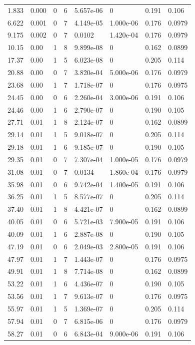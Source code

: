 \documentclass[preview]{standalone}
\begin{document}
{{\begin{tabular}{L{1.2cm}C{1.2cm} C{0.3cm}C{0.5cm} C{1.4cm}C{1.4cm} C{1.4cm}C{1.4cm}}
  1.833  &  0.000  & 0     &  6 &  5.657e-06  & 0  & 0.191 &  0.106   \\ 
  6.622  &  0.001  & 0     &  7 &  4.149e-05  & 1.000e-06  & 0.176 &  0.0979   \\ 
  9.175  &  0.002  & 0     &  7 &  0.0102  & 1.420e-04  & 0.176 &  0.0979   \\ 
  10.15  &  0.00  & 1     &  8 &  9.899e-08  & 0  & 0.162 &  0.0899   \\ 
  17.37  &  0.00  & 1     &  5 &  6.023e-08  & 0  & 0.205 &  0.114   \\ 
  20.88  &  0.00  & 0     &  7 &  3.820e-04  & 5.000e-06  & 0.176 &  0.0979   \\ 
  23.68  &  0.00  & 1     &  7 &  1.718e-07  & 0  & 0.176 &  0.0975   \\ 
  24.45  &  0.00  & 0     &  6 &  2.260e-04  & 3.000e-06  & 0.191 &  0.106   \\ 
  24.46  &  0.00  & 1     &  6 &  2.790e-07  & 0  & 0.190 &  0.105   \\ 
  27.71  &  0.01  & 1     &  8 &  2.124e-07  & 0  & 0.162 &  0.0899   \\ 
  29.14  &  0.01  & 1     &  5 &  9.018e-07  & 0  & 0.205 &  0.114   \\ 
  29.18  &  0.01  & 1     &  6 &  9.185e-07  & 0  & 0.190 &  0.105   \\ 
  29.35  &  0.01  & 0     &  7 &  7.307e-04  & 1.000e-05  & 0.176 &  0.0979   \\ 
  31.08  &  0.01  & 0     &  7 &  0.0134  & 1.860e-04  & 0.176 &  0.0979   \\ 
  35.98  &  0.01  & 0     &  6 &  9.742e-04  & 1.400e-05  & 0.191 &  0.106   \\ 
  36.25  &  0.01  & 1     &  5 &  8.577e-07  & 0  & 0.205 &  0.114   \\ 
  37.40  &  0.01  & 1     &  8 &  4.421e-07  & 0  & 0.162 &  0.0899   \\ 
  40.05  &  0.01  & 0     &  6 &  5.721e-03  & 7.900e-05  & 0.191 &  0.106   \\ 
  40.09  &  0.01  & 1     &  6 &  2.887e-08  & 0  & 0.190 &  0.105   \\ 
  47.19  &  0.01  & 0     &  6 &  2.049e-03  & 2.800e-05  & 0.191 &  0.106   \\ 
  47.97  &  0.01  & 1     &  7 &  1.443e-07  & 0  & 0.176 &  0.0975   \\ 
  49.91  &  0.01  & 1     &  8 &  7.714e-08  & 0  & 0.162 &  0.0899   \\ 
  53.22  &  0.01  & 1     &  6 &  4.436e-07  & 0  & 0.190 &  0.105   \\ 
  53.56  &  0.01  & 1     &  7 &  9.613e-07  & 0  & 0.176 &  0.0975   \\ 
  55.97  &  0.01  & 1     &  5 &  1.369e-07  & 0  & 0.205 &  0.114   \\ 
  57.94  &  0.01  & 0     &  7 &  6.815e-06  & 0  & 0.176 &  0.0979   \\ 
  58.27  &  0.01  & 0     &  6 &  6.843e-04  & 9.000e-06  & 0.191 &  0.106   \\ 
\hline 
\end{tabular} 

}}
\end{document}

